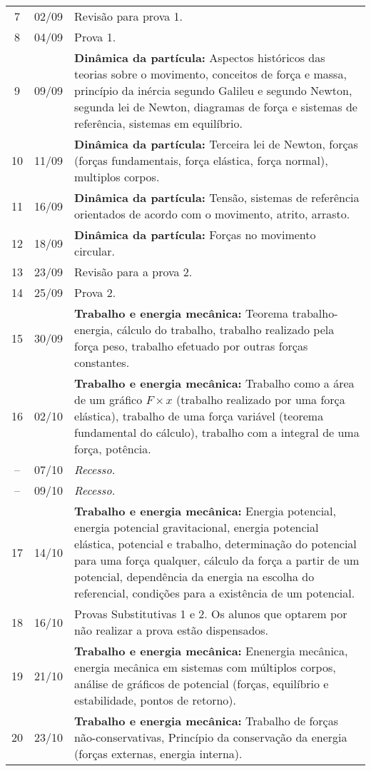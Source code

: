 \begin{center}
\begin{longtable}{ccp{70mm}}
  7 & 02/09 & Revisão para prova 1. \\
  8 & 04/09 & Prova 1. \\
  9 & 09/09 & \textbf{Dinâmica da partícula:} Aspectos históricos das teorias sobre o movimento, conceitos de força e massa, princípio da inércia segundo Galileu e segundo Newton, segunda lei de Newton, diagramas de força e sistemas de referência, sistemas em equilíbrio.\\
 10 & 11/09 & \textbf{Dinâmica da partícula:} Terceira lei de Newton, forças (forças fundamentais, força elástica, força normal), multiplos corpos.\\
 11 & 16/09 & \textbf{Dinâmica da partícula:} Tensão, sistemas de referência orientados de acordo com o movimento, atrito, arrasto.\\
 12 & 18/09 & \textbf{Dinâmica da partícula:} Forças no movimento circular. \\
 13 & 23/09 & Revisão para a prova 2. \\
 14 & 25/09 & Prova 2. \\
 15 & 30/09 & \textbf{Trabalho e energia mecânica:} Teorema trabalho-energia, cálculo do trabalho, trabalho realizado pela força peso, trabalho efetuado por outras forças constantes.\\
 16 & 02/10 & \textbf{Trabalho e energia mecânica:} Trabalho como a área de um gráfico $F \times x$ (trabalho realizado por uma força elástica), trabalho de uma força variável (teorema fundamental do cálculo), trabalho com a integral de uma força, potência. \\
 -- & 07/10 & \emph{Recesso.} \\
 -- & 09/10 & \emph{Recesso.} \\
 17 & 14/10 & \textbf{Trabalho e energia mecânica:} Energia potencial, energia potencial gravitacional, energia potencial elástica, potencial e trabalho, determinação do potencial para uma força qualquer, cálculo da força a partir de um potencial, dependência da energia na escolha do referencial, condições para a existência de um potencial. \\
 18 & 16/10 & Provas Substitutivas 1 e 2. Os alunos que optarem por não realizar a prova estão dispensados. \\
 19 & 21/10 & \textbf{Trabalho e energia mecânica:} Enenergia mecânica, energia mecânica em sistemas com múltiplos corpos, análise de gráficos de potencial (forças, equilíbrio e estabilidade, pontos de retorno).\\
 20 & 23/10 & \textbf{Trabalho e energia mecânica:} Trabalho de forças não-conservativas, Princípio da conservação da energia (forças externas, energia interna). \\

\end{longtable}
\end{center}
